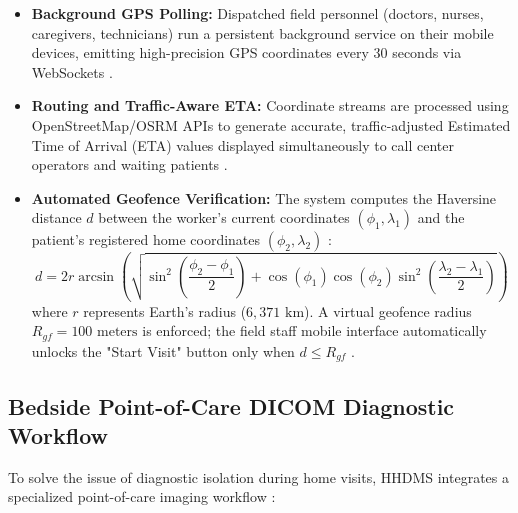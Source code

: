 \documentclass[lettersize,onecolumn,journal]{IEEEtran}
\begin{document}
	\begin{itemize}
		\item \textbf{Background GPS Polling:} Dispatched field personnel (doctors, nurses, caregivers, technicians) run a persistent background service on their mobile devices, emitting high-precision GPS coordinates every 30 seconds via WebSockets \cite{fette2011websocket, zandbergen2009accuracy}.
		\item \textbf{Routing and Traffic-Aware ETA:} Coordinate streams are processed using OpenStreetMap\slash OSRM APIs to generate accurate, traffic-adjusted Estimated Time of Arrival (ETA) values displayed simultaneously to call center operators and waiting patients \cite{osrm_routing}.
		\item \textbf{Automated Geofence Verification:} The system computes the Haversine distance $d$ between the worker's current coordinates $(\phi_1, \lambda_1)$ and the patient's registered home coordinates $(\phi_2, \lambda_2)$ \cite{haversine_formula}:
		\begin{equation}
			d = 2r \arcsin \left( \sqrt{\sin^2\left(\frac{\phi_2 - \phi_1}{2}\right) + \cos(\phi_1)\cos(\phi_2)\sin^2\left(\frac{\lambda_2 - \lambda_1}{2}\right)} \right)
		\end{equation}
		where $r$ represents Earth's radius ($6,371 \text{ km}$). A virtual geofence radius $R_{gf} = 100 \text{ meters}$ is enforced; the field staff mobile interface automatically unlocks the "Start Visit" button only when $d \le R_{gf}$ \cite{haversine_formula}.
	\end{itemize}
	
	\subsection{Bedside Point-of-Care DICOM Diagnostic Workflow}
	To solve the issue of diagnostic isolation during home visits, HHDMS integrates a specialized point-of-care imaging workflow \cite{dicom2021, pacs2001}:
	
\end{document}
